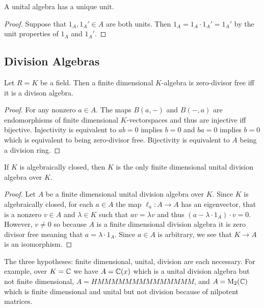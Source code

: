 \documentclass[12pt]{extarticle}
\begin{document}
\begin{prop}
A unital algebra has a unique unit. 
\end{prop}

\begin{proof}
Suppose that $1_A, 1_A' \in A$ are both units. Then $1_A = 1_A \cdot 1_A' = 1_A'$ by the unit properties of $1_A$ and $1_A'$.
\end{proof}


\subsection{Division Algebras}

\begin{prop}
Let $R = K$ be a field. Then a finite dimensional $K$-algebra is zero-divisor free iff it is a divison algebra.
\end{prop}

\begin{proof}
For any nonzero $a \in A$. The maps $B(a, -)$ and $B(-, a)$ are endomorphisms of finite dimensional $K$-vectorspaces and thus are injective iff bijective. Injectivity is equivalent to $ab = 0$ implies $b = 0$ and $ba = 0$ implies $b = 0$ which is equivalent to being zero-divisor free. Bijectivity is equivalent to $A$ being a division ring.
\end{proof}

\begin{prop}
If $K$ is algebraically closed, then $K$ is the only finite dimensional unital division algebra over $K$.
\end{prop}

\begin{proof}
Let $A$ be a finite dimensional unital division algebra over $K$.
Since $K$ is algebraically closed, for each $a \in A$ the map $\ell_a : A \to A$ has an eigenvector, that is a nonzero $v \in A$ and $\lambda \in K$ such that $a v = \lambda v$ and thus $(a - \lambda \cdot 1_A) \cdot v = 0$. However, $v \neq 0$ so because $A$ is a finite dimensional division algebra it is zero divisor free meaning that $a = \lambda \cdot 1_A$. Since $a \in A$ is arbitrary, we see that $K \to A$ is an isomorphism.
\end{proof}

\begin{rmk}
The three hypotheses: finite dimensional, unital, division are each necessary. For example, over $K = \mathbb{C}$ we have $A = \mathbb{C}(x)$ which is a unital division algebra but not finite dimensional, $A = HMMMMMMMMMMMMMM$, and $A = \mathrm{M}_2(\mathbb{C})$ which is finite dimensional and unital but not division because of nilpotent matrices.
\end{rmk}
\end{document}
